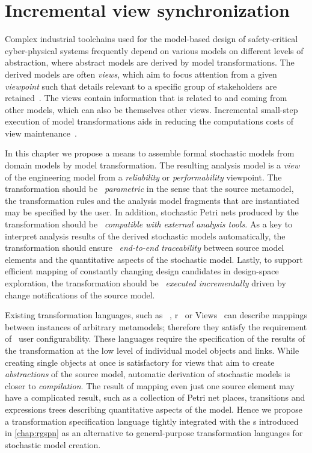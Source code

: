 \chapter{Incremental view synchronization}
\label{chap:transform}

Complex industrial toolchains used for the model-based design of safety-critical cyber-physical systems frequently depend on various models on different levels of abstraction, where abstract models are derived by model transformations. The derived models are often \emph{views}, which aim to focus attention from a given \emph{viewpoint} such that details relevant to a specific group of stakeholders are retained~\citep{Bruneliere17survey}. The views contain information that is related to and coming from other models, which can also be themselves other views. Incremental small-step execution of model transformations aids in reducing the computations costs of view maintenance~\citep{Varro15styles}.

In this chapter we propose a means to assemble formal stochastic models from domain models by model transformation. The resulting analysis model is a \emph{view} of the engineering model from a \emph{reliability} or \emph{performability} viewpoint. The transformation should be ~\emph{parametric} in the sense that the source metamodel, the transformation rules and the analysis model fragments that are instantiated may be specified by the user. In addition, stochastic Petri nets produced by the transformation should be ~\emph{compatible with external analysis tools.} As a key to interpret analysis results of the derived stochastic models automatically, the transformation should ensure ~\emph{end-to-end traceability} between source model elements and the quantitative aspects of the stochastic model. Lastly, to support efficient mapping of constantly changing design candidates in design-space exploration, the transformation should be ~\emph{executed incrementally} driven by change notifications of the source model.

Existing transformation languages, such as ~\citep{Jouault08atl}, r~\citep[Chapter~7]{OMG16qvt} or  Views~\citep{Debreceni14viewmodel} can describe mappings between instances of arbitrary metamodels; therefore they satisfy the requirement of ~user configurability. These languages require the specification of the results of the transformation at the low level of individual model objects and links. While creating single objects at once is satisfactory for views that aim to create \emph{abstractions} of the source model, automatic derivation of stochastic models is closer to \emph{compilation}. The result of mapping even just one source element may have a complicated result, such as a collection of Petri net places, transitions and expressions trees describing quantitative aspects of the model. Hence we propose a transformation specification language tightly integrated with the s introduced in \cref{chap:rgspn} as an alternative to general-purpose transformation languages for stochastic model creation.

